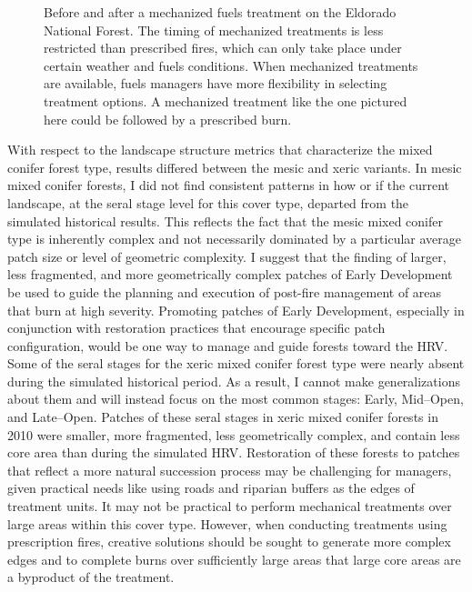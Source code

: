 \begin{figure}[!htbp]
  \centering
  \caption{Before and after a mechanized fuels treatment on the Eldorado National Forest. The timing of mechanized treatments is less restricted than prescribed fires, which can only take place under certain weather and fuels conditions. When mechanized treatments are available, fuels managers have more flexibility in selecting treatment options. A mechanized treatment like the one pictured here could be followed by a prescribed burn.} 
  \label{fig:pfire_comp_EDNF}
\end{figure}


With respect to the landscape structure metrics that characterize the mixed conifer forest type, results differed between the mesic and xeric variants. In mesic mixed conifer forests, I did not find consistent patterns in how or if the current landscape, at the seral stage level for this cover type, departed from the simulated historical results. This reflects the fact that the mesic mixed conifer type is inherently complex and not necessarily dominated by a particular average patch size or level of geometric complexity. I suggest that the finding of larger, less fragmented, and more geometrically complex patches of Early Development be used to guide the planning and execution of post-fire management of areas that burn at high severity. Promoting patches of Early Development, especially in conjunction with restoration practices that encourage specific patch configuration, would be one way to manage and guide forests toward the HRV.
%
Some of the seral stages for the xeric mixed conifer forest type were nearly absent during the simulated historical period. As a result, I cannot make generalizations about them and will instead focus on the most common stages: Early, Mid--Open, and Late--Open. Patches of these seral stages in xeric mixed conifer forests in 2010 were smaller, more fragmented, less geometrically complex, and contain less core area than during the simulated HRV. 
%
Restoration of these forests to patches that reflect a more natural succession process may be challenging for managers, given practical needs like using roads and riparian buffers as the edges of treatment units. It may not be practical to perform mechanical treatments over large areas within this cover type. However, when conducting treatments using prescription fires, creative solutions should be sought to generate more complex edges and to complete burns over sufficiently large areas that large core areas are a byproduct of the treatment.











